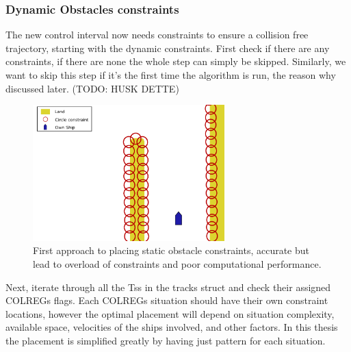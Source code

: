 \subsubsection*{Dynamic Obstacles constraints}
The new control interval now needs constraints to ensure a collision free trajectory, starting with the dynamic constraints.
First check if there are any constraints, if there are none the whole step can simply be skipped. Similarly, we want to skip
this step if it's the first time the algorithm is run, the reason why discussed later. (TODO: HUSK DETTE)

\begin{figure}[ht!]
    \centering
    \includegraphics[width=0.66\textwidth]{Images/StaticObs_Naive.pdf}
    \caption{First approach to placing static obstacle constraints, accurate but lead to overload of constraints and poor computational performance.}     \label{FIG: Static Obs Naive approach 1}
\end{figure}

Next, iterate through all the \gls{Ts}s in the tracks struct and check their assigned COLREGs flags.
Each COLREGs situation should have their own constraint locations, however the optimal placement
will depend on situation complexity, available space, velocities of the ships involved, and other factors. In
this thesis the placement is simplified greatly by having just pattern for each situation.

